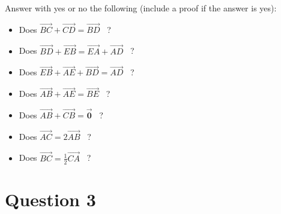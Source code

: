 \documentclass{article}
\newcommand{\pvec}[1]{\overrightarrow{#1}}
\begin{document}
Answer with yes or no the following (include a proof if the answer is yes):
\begin{itemize}
\item Does \(\pvec{BC} + \pvec{CD} = \pvec{BD}\) ~?
\item Does \(\pvec{BD} + \pvec{EB} = \pvec{EA} + \pvec{AD}\) ~?
\item Does \(\pvec{EB} + \pvec{AE} + \pvec{BD} = \pvec{AD}\) ~?
\item Does \(\pvec{AB} + \pvec{AE} = \pvec{BE}\) ~?
\item Does \(\pvec{AB} + \pvec{CB} = \pvec{\mathbf{0}}\) ~?
\item Does \(\pvec{AC} = 2\pvec{AB}\) ~?
\item Does \(\pvec{BC} = \frac{1}{2}\pvec{CA}\) ~?
\end{itemize}

\section*{Question 3}
\end{document}
